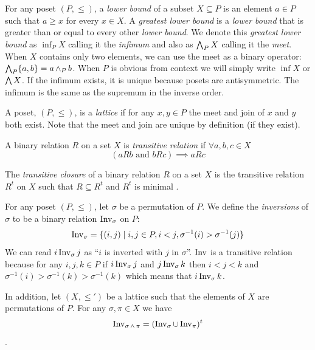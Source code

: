 	\begin{definition}
		For any poset $(P, \le)$, a \emph{lower bound} of a subset $X \subseteq P$ is an element $a \in P$ such that $a \ge x$ for every $x \in X$. A \emph{greatest lower bound} is a \emph{lower bound} that is greater than or equal to every other \emph{lower bound}. We denote this \emph{greatest lower bound} as $\inf_P X$ calling it the \emph{infimum} \cite{birkhoﬀ1967lattice} and also as $\operatorname{\bigwedge}_P X$ calling it the \emph{meet}. When $X$ contains only two elements, we can use the meet as a binary operator: $\operatorname{\bigwedge}_P \{a, b\} = a \operatorname{\wedge}_P b$. When $P$ is obvious from context we will simply write $\inf X$ or $\operatorname{\bigwedge} X$. If the infimum exists, it is unique because posets are antisymmetric. The infimum is the same as the supremum in the inverse order.
	\end{definition}

	\begin{definition}
		\label{lattice-definition}
		A poset, $(P, \le)$, is a \emph{lattice} if for any $x, y \in P$ the meet and join of $x$ and $y$ both exist. Note that the meet and join are unique by definition (if they exist).
	\end{definition}

	\begin{definition}
		A binary relation $R$ on a set $X$ is \emph{transitive relation} if $\forall a,b,c \in X$
		\[
			(aRb \textrm{ and } bRc) \implies aRc
		\]
	\end{definition}

	\begin{definition}
		The \emph{transitive closure} of a binary relation $R$ on a set $X$ is the transitive relation $R^t$ on $X$ such that $R \subseteq R^t$ and $R^t$ is minimal \cite[p. 337]{lidl1998applied}.
	\end{definition}

	\begin{definition}
		For any poset $(P, \le)$, let $\sigma$ be a permutation of $P$. We define the \emph{inversions} of $\sigma$ to be a binary relation $\operatorname{Inv}_{\sigma}$ on $P$:
		\[
			\operatorname{Inv}_{\sigma} = \{(i,j) \mid i, j \in P, i < j, \sigma^{-1}(i) > \sigma^{-1}(j)\}
		\]
		We can read $i \operatorname{Inv}_{\sigma} j$ as ``$i$ is inverted with $j$ in $\sigma$''. $\operatorname{Inv}$ is a transitive relation because for any $i,j,k \in P$ if $i \operatorname{Inv}_{\sigma} j$ and $j \operatorname{Inv}_{\sigma} k$ then $i < j < k$ and $\sigma^{-1}(i) > \sigma^{-1}(k) > \sigma^{-1}(k)$ which means that $i \operatorname{Inv}_{\sigma} k$.

		In addition, let $(X, \le')$ be a lattice such that the elements of $X$ are permutations of $P$. For any $\sigma, \pi \in X$ we have
		\[
			\operatorname{Inv}_{\sigma \operatorname{\wedge} \pi} = (\operatorname{Inv}_{\sigma} \cup \operatorname{Inv}_{\pi})^t
		\]
		\cite{markowsky1994permutation}.
	\end{definition}

